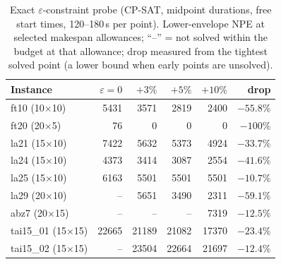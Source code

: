 \documentclass[preprint,12pt]{elsarticle}
\begin{document}
\begin{table}[htb]
\centering\small
\caption{Exact $\varepsilon$-constraint probe (CP-SAT, midpoint durations,
free start times, 120--180\,s per point). Lower-envelope NPE at selected
makespan allowances; ``--'' = not solved within the budget at that
allowance; drop measured from the tightest solved point (a lower bound
when early points are unsolved).}
\label{tab:probe}
\begin{tabular}{l rrrr r}
\toprule
Instance & $\varepsilon{=}0$ & $+3\%$ & $+5\%$ & $+10\%$ & drop \\
\midrule
ft10 (10$\times$10)  & 5431 & 3571 & 2819 & 2400 & $-55.8\%$ \\
ft20 (20$\times$5)   & 76   & 0    & 0    & 0    & $-100\%$ \\
la21 (15$\times$10)  & 7422 & 5632 & 5373 & 4924 & $-33.7\%$ \\
la24 (15$\times$10)  & 4373 & 3414 & 3087 & 2554 & $-41.6\%$ \\
la25 (15$\times$10)  & 6163 & 5501 & 5501 & 5501 & $-10.7\%$ \\
la29 (20$\times$10)  & --   & 5651 & 3490 & 2311 & $-59.1\%$ \\
abz7 (20$\times$15)  & --   & --   & --   & 7319 & $-12.5\%$ \\
tai15\_01 (15$\times$15) & 22665 & 21189 & 21082 & 17370 & $-23.4\%$ \\
tai15\_02 (15$\times$15) & --  & 23504 & 22664 & 21697 & $-12.4\%$ \\
\bottomrule
\end{tabular}
\end{table}
\end{document}
